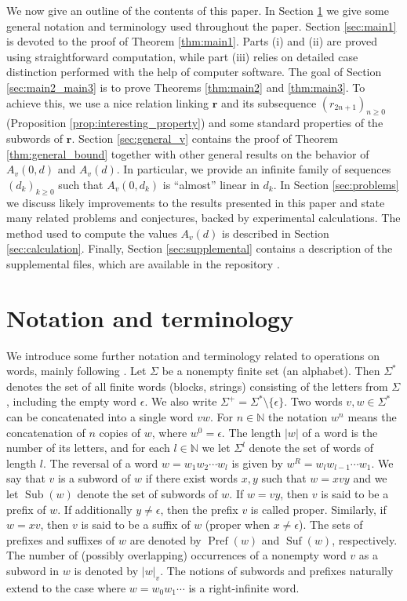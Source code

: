 \documentclass[a4paper,11pt]{amsart}
\theoremstyle{definition}
\newcommand{\N}{\mathbb{N}}
\newcommand{\Pref}{\operatorname{Pref}}
\newcommand{\Suf}{\operatorname{Suf}}
\newcommand{\Sub}{\operatorname{Sub}}
\begin{document}
We now give an outline of the contents of this paper. In Section \ref{sec:notation} we give some general notation and terminology used throughout the paper. Section \ref{sec:main1} is devoted to the proof of Theorem \ref{thm:main1}. Parts (i) and (ii) are proved using straightforward computation, while part (iii) relies on detailed case distinction performed with the help of computer software. The goal of Section \ref{sec:main2_main3} is to prove Theorems \ref{thm:main2} and \ref{thm:main3}. To achieve this, we use a nice relation linking $\mathbf{r}$ and its subsequence $(r_{2n+1})_{n \geq 0}$ (Proposition \ref{prop:interesting_property}) and some standard properties of the subwords of $\mathbf{r}$. Section \ref{sec:general_v} contains the proof of Theorem \ref{thm:general_bound} together with other general results on the behavior of $A_v(0,d)$ and $A_v(d)$. In particular, we provide an infinite family of sequences $(d_k)_{k \geq 0}$ such that $A_v(0,d_k)$ is ``almost'' linear in $d_k$. In Section \ref{sec:problems} we discuss likely improvements to the results presented in this paper and state many related problems and conjectures, backed by experimental calculations.  The method used to compute the values $A_v(d)$ is described in Section \ref{sec:calculation}. Finally,  Section \ref{sec:supplemental} contains a description of the supplemental files, which are available in the repository \cite{Git}.




\section{Notation and terminology} \label{sec:notation}

We introduce some further notation and terminology related to operations on words, mainly following \cite[Chapter 1]{AS03}. Let $\Sigma$ be a nonempty finite set (an alphabet). Then $\Sigma^*$ denotes the set of all finite words (blocks, strings) consisting of the letters from $\Sigma$, including the empty word $\epsilon$. We also write $\Sigma^{+} = \Sigma^* \setminus \{\epsilon\}$. Two words $v,w \in \Sigma^*$ can be concatenated into a single word $vw$. For $n \in \N$ the notation $w^n$ means the concatenation of $n$ copies of $w$, where $w^0 = \epsilon$. The length $|w|$ of a word is the number of its letters, and for each $l \in \N$ we let $\Sigma^l$ denote the set of words of length $l$. The reversal of a word $w = w_1 w_2 \cdots w_l$ is given by $w^R = w_l w_{l-1} \cdots w_1$. We say that $v$ is a subword of $w$ if there exist words $x,y$ such that $w = xvy$ and we let $\Sub(w)$ denote the set of subwords of $w$. If $w=vy$, then $v$ is said to be a prefix of $w$. If additionally $y \neq \epsilon$, then the prefix $v$ is called proper. Similarly, if $w = xv$, then $v$ is said to be a suffix of $w$ (proper when $x \neq \epsilon$). The sets of prefixes and suffixes of $w$ are denoted by $\Pref(w)$ and $\Suf(w)$, respectively. The number of (possibly overlapping) occurrences of a nonempty word $v$ as a subword in $w$ is denoted by $|w|_v$. The notions of subwords and prefixes naturally extend to the case where $w=w_0w_1\cdots$ is a right-infinite word.
\end{document}

